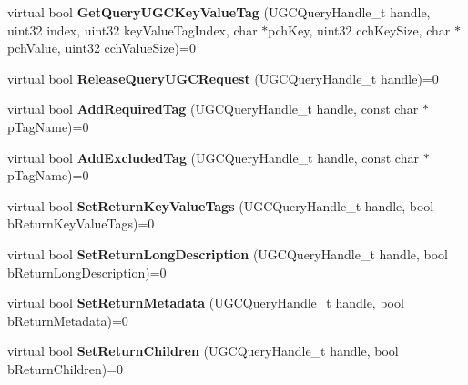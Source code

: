 \begin{DoxyCompactItemize}
\item 
\hypertarget{classISteamUGC_ad4661a1f97453b8691c179ac8584cea6}{}virtual bool {\bfseries Get\+Query\+U\+G\+C\+Key\+Value\+Tag} (U\+G\+C\+Query\+Handle\+\_\+t handle, uint32 index, uint32 key\+Value\+Tag\+Index, char $\ast$pch\+Key, uint32 cch\+Key\+Size, char $\ast$pch\+Value, uint32 cch\+Value\+Size)=0\label{classISteamUGC_ad4661a1f97453b8691c179ac8584cea6}

\item 
\hypertarget{classISteamUGC_a4157e9b5ce82b0abfd436675c6fe3ba6}{}virtual bool {\bfseries Release\+Query\+U\+G\+C\+Request} (U\+G\+C\+Query\+Handle\+\_\+t handle)=0\label{classISteamUGC_a4157e9b5ce82b0abfd436675c6fe3ba6}

\item 
\hypertarget{classISteamUGC_a9eb0d974840e25ea042ca8f78e0f27d8}{}virtual bool {\bfseries Add\+Required\+Tag} (U\+G\+C\+Query\+Handle\+\_\+t handle, const char $\ast$p\+Tag\+Name)=0\label{classISteamUGC_a9eb0d974840e25ea042ca8f78e0f27d8}

\item 
\hypertarget{classISteamUGC_acfb8abf198a2c05c40e83f117275f7b7}{}virtual bool {\bfseries Add\+Excluded\+Tag} (U\+G\+C\+Query\+Handle\+\_\+t handle, const char $\ast$p\+Tag\+Name)=0\label{classISteamUGC_acfb8abf198a2c05c40e83f117275f7b7}

\item 
\hypertarget{classISteamUGC_a1f8271d5968ab5657ec7b43a0b8a3903}{}virtual bool {\bfseries Set\+Return\+Key\+Value\+Tags} (U\+G\+C\+Query\+Handle\+\_\+t handle, bool b\+Return\+Key\+Value\+Tags)=0\label{classISteamUGC_a1f8271d5968ab5657ec7b43a0b8a3903}

\item 
\hypertarget{classISteamUGC_ac8502ab719c8b08d73c2eed384900eeb}{}virtual bool {\bfseries Set\+Return\+Long\+Description} (U\+G\+C\+Query\+Handle\+\_\+t handle, bool b\+Return\+Long\+Description)=0\label{classISteamUGC_ac8502ab719c8b08d73c2eed384900eeb}

\item 
\hypertarget{classISteamUGC_a88451713f55c82c7c105fc841243195a}{}virtual bool {\bfseries Set\+Return\+Metadata} (U\+G\+C\+Query\+Handle\+\_\+t handle, bool b\+Return\+Metadata)=0\label{classISteamUGC_a88451713f55c82c7c105fc841243195a}

\item 
\hypertarget{classISteamUGC_abf26bae1e891aacc62f24791c8ba4544}{}virtual bool {\bfseries Set\+Return\+Children} (U\+G\+C\+Query\+Handle\+\_\+t handle, bool b\+Return\+Children)=0\label{classISteamUGC_abf26bae1e891aacc62f24791c8ba4544}


\end{DoxyCompactItemize}
